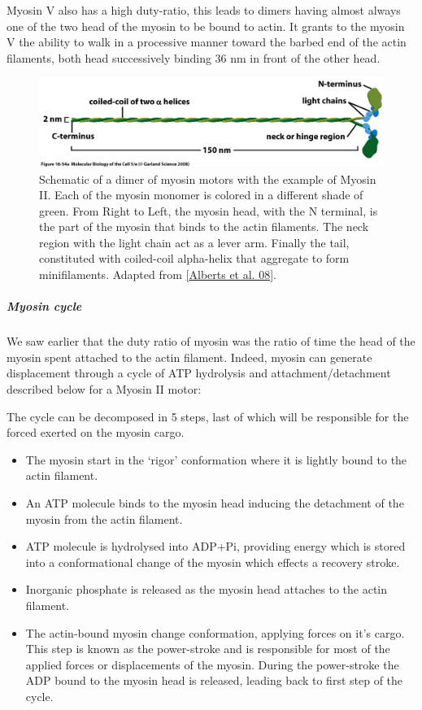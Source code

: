 \documentclass[A4paperpaper,11pt,english]{sphinxmanual}
\begin{document}
Myosin V also has a high duty-ratio, this leads to dimers having almost always
one of the two head of the myosin to be bound to actin. It grants to the myosin
V the ability to walk in a processive manner toward the barbed end of
the actin filaments, both head successively binding 36 nm in front of the other
head.
\begin{figure}[htbp]
\centering
\capstart

\includegraphics[width=0.700\linewidth]{figure-16-54a.jpg}
\caption{Schematic of a dimer of myosin motors with the example of Myosin II.
Each of the myosin monomer is colored in a
different shade of green. From Right to Left, the myosin head, with the N
terminal, is the part of the myosin that binds to the actin filaments. The
neck region with the light chain act as a lever arm. Finally the tail,
constituted with coiled-coil alpha-helix that aggregate to form minifilaments.
Adapted from {\hyperref[index-latex:alberts2008]{{[}Alberts et al. 08{]}}}.}\label{index-latex:fig-myosin}\end{figure}


\subparagraph{Myosin cycle}
\label{index-latex:myosin-cycle}
We saw earlier that the duty ratio of myosin was the ratio of time the head of
the myosin spent attached to the actin filament. Indeed, myosin can generate
displacement through a cycle of ATP hydrolysis and attachment/detachment
described below for a Myosin II motor:

The cycle can be decomposed in 5 steps, last of which will be responsible for
the forced exerted on the myosin cargo.
\begin{itemize}
\item {} 
The myosin start in the `rigor' conformation where it is lightly bound to
the actin filament.

\item {} 
An ATP molecule binds to the myosin head inducing the detachment of the
myosin from the actin filament.

\item {} 
ATP molecule is hydrolysed into ADP+Pi, providing energy which is stored
into a conformational change of the myosin which effects a recovery
stroke.

\item {} 
Inorganic phosphate is released as the myosin head attaches to the actin
filament.

\item {} 
The actin-bound myosin change conformation, applying forces on it's
cargo. This step is known as the power-stroke and is responsible for most
of the applied forces or displacements of the myosin. During the
power-stroke the ADP bound to the myosin head is released, leading back
to first step of the cycle.

\end{itemize}
\end{document}
